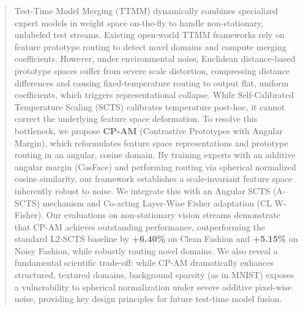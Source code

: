 \documentclass{article}
\theoremstyle{plain}
\theoremstyle{definition}
\theoremstyle{remark}
\begin{document}

\printAffiliationsAndNotice{}

\begin{abstract}
Test-Time Model Merging (TTMM) dynamically combines specialized expert models in weight space on-the-fly to handle non-stationary, unlabeled test streams. Existing open-world TTMM frameworks rely on feature prototype routing to detect novel domains and compute merging coefficients. However, under environmental noise, Euclidean distance-based prototype spaces suffer from severe scale distortion, compressing distance differences and causing fixed-temperature routing to output flat, uniform coefficients, which triggers representational collapse. While Self-Calibrated Temperature Scaling (SCTS) calibrates temperature post-hoc, it cannot correct the underlying feature space deformation. To resolve this bottleneck, we propose \textbf{CP-AM} (Contrastive Prototypes with Angular Margin), which reformulates feature space representations and prototype routing in an angular, cosine domain. By training experts with an additive angular margin (CosFace) and performing routing via spherical normalized cosine similarity, our framework establishes a scale-invariant feature space inherently robust to noise. We integrate this with an Angular SCTS (A-SCTS) mechanism and Co-acting Layer-Wise Fisher adaptation (CL W-Fisher). Our evaluations on non-stationary vision streams demonstrate that CP-AM achieves outstanding performance, outperforming the standard L2-SCTS baseline by \textbf{+6.40\%} on Clean Fashion and \textbf{+5.15\%} on Noisy Fashion, while robustly routing novel domains. We also reveal a fundamental scientific trade-off: while CP-AM dramatically enhances structured, textured domains, background sparsity (as in MNIST) exposes a vulnerability to spherical normalization under severe additive pixel-wise noise, providing key design principles for future test-time model fusion.
\end{abstract}
\end{document}
